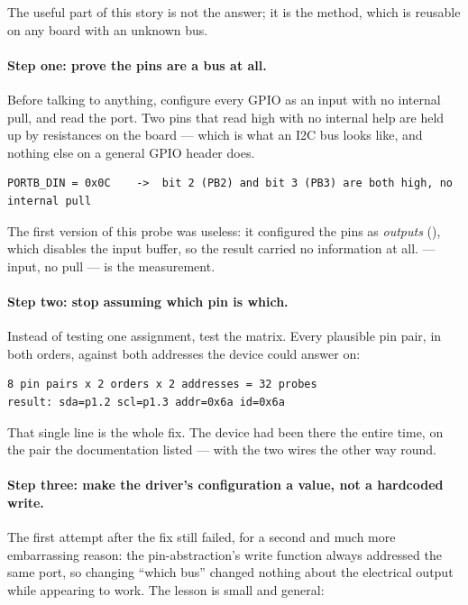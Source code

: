 The useful part of this story is not the answer; it is the method, which is reusable on any
board with an unknown bus.

\paragraph{Step one: prove the pins are a bus at all.}
Before talking to anything, configure every GPIO as an input with no internal pull, and read
the port. Two pins that read high with no internal help are held up by resistances on the
board — which is what an I2C bus looks like, and nothing else on a general GPIO header does.

\begin{verbatim}
PORTB_DIN = 0x0C    ->  bit 2 (PB2) and bit 3 (PB3) are both high, no internal pull
\end{verbatim}

\begin{notebox}
    The first version of this probe was useless: it configured the pins as \emph{outputs}
    (), which disables the input buffer, so the result carried no
    information at all.  — input, no pull — is the measurement.
\end{notebox}

\paragraph{Step two: stop assuming which pin is which.}
Instead of testing one assignment, test the matrix. Every plausible pin pair, in both
orders, against both addresses the device could answer on:

\begin{verbatim}
8 pin pairs x 2 orders x 2 addresses = 32 probes
result: sda=p1.2 scl=p1.3 addr=0x6a id=0x6a
\end{verbatim}

That single line is the whole fix. The device had been there the entire time, on the pair
the documentation listed — with the two wires the other way round.

\paragraph{Step three: make the driver's configuration a value, not a hardcoded write.}
The first attempt after the fix still failed, for a second and much more embarrassing reason:
the pin-abstraction's write function always addressed the same port, so changing ``which
bus'' changed nothing about the electrical output while appearing to work. The lesson is
small and general:

